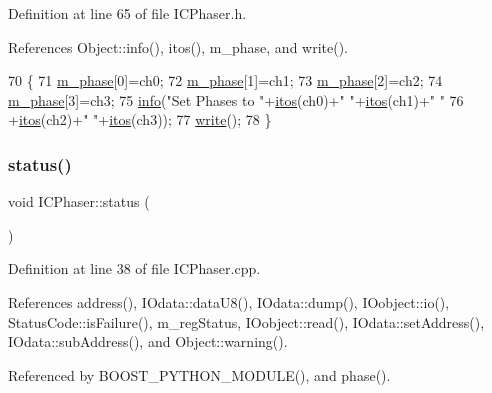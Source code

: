 Definition at line 65 of file I\+C\+Phaser.\+h.



References Object\+::info(), itos(), m\+\_\+phase, and write().


\begin{DoxyCode}
70        \{
71     \hyperlink{classICPhaser_afe2a4527d58d08342d631dfa7c731203}{m\_phase}[0]=ch0;
72     \hyperlink{classICPhaser_afe2a4527d58d08342d631dfa7c731203}{m\_phase}[1]=ch1;
73     \hyperlink{classICPhaser_afe2a4527d58d08342d631dfa7c731203}{m\_phase}[2]=ch2;
74     \hyperlink{classICPhaser_afe2a4527d58d08342d631dfa7c731203}{m\_phase}[3]=ch3;
75     \hyperlink{classObject_a644fd329ea4cb85f54fa6846484b84a8}{info}(\textcolor{stringliteral}{"Set Phases to "}+\hyperlink{Tools_8h_af330027dbdafb9a30768b3613c553e60}{itos}(ch0)+\textcolor{stringliteral}{" "}+\hyperlink{Tools_8h_af330027dbdafb9a30768b3613c553e60}{itos}(ch1)+\textcolor{stringliteral}{" "}
76      +\hyperlink{Tools_8h_af330027dbdafb9a30768b3613c553e60}{itos}(ch2)+\textcolor{stringliteral}{" "}+\hyperlink{Tools_8h_af330027dbdafb9a30768b3613c553e60}{itos}(ch3));
77     \hyperlink{classICPhaser_a160d0f9b959c865fc3458857bb303dd0}{write}();
78   \}
\end{DoxyCode}
\mbox{\label{classICPhaser_a8169d433a2789fdb1453d01f1c11517f}} 
\subsubsection{\texorpdfstring{status()}{status()}}
{\footnotesize\ttfamily void I\+C\+Phaser\+::status (\begin{DoxyParamCaption}{ }\end{DoxyParamCaption})}



Definition at line 38 of file I\+C\+Phaser.\+cpp.



References address(), I\+Odata\+::data\+U8(), I\+Odata\+::dump(), I\+Oobject\+::io(), Status\+Code\+::is\+Failure(), m\+\_\+reg\+Status, I\+Oobject\+::read(), I\+Odata\+::set\+Address(), I\+Odata\+::sub\+Address(), and Object\+::warning().



Referenced by B\+O\+O\+S\+T\+\_\+\+P\+Y\+T\+H\+O\+N\+\_\+\+M\+O\+D\+U\+L\+E(), and phase().


